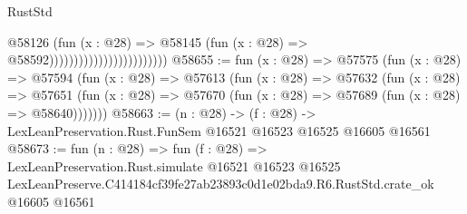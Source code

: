 \begin{lexlean}{RustStd}
\begin{coremodule}
                                              @58126
                                                (fun (x : @28) =>
                                                @58145
                                                  (fun (x : @28) => @58592))))))))))))))))))))))))
@58655 := fun (x : @28) =>
  @57575
    (fun (x : @28) =>
    @57594
      (fun (x : @28) =>
      @57613
        (fun (x : @28) =>
        @57632
          (fun (x : @28) =>
          @57651 (fun (x : @28) => @57670 (fun (x : @28) => @57689 (fun (x : @28) => @58640)))))))
@58663 := (n : @28) ->
  (f : @28) -> LexLeanPreservation.Rust.FunSem @16521 @16523 @16525 @16605 @16561
@58673 := fun (n : @28) =>
  fun (f : @28) =>
  LexLeanPreservation.Rust.simulate
    @16521
    @16523
    @16525
    LexLeanPreserve.C414184cf39fe27ab23893c0d1e02bda9.R6.RustStd.crate_ok
    @16605
    @16561
\end{coremodule}
\end{lexlean}
